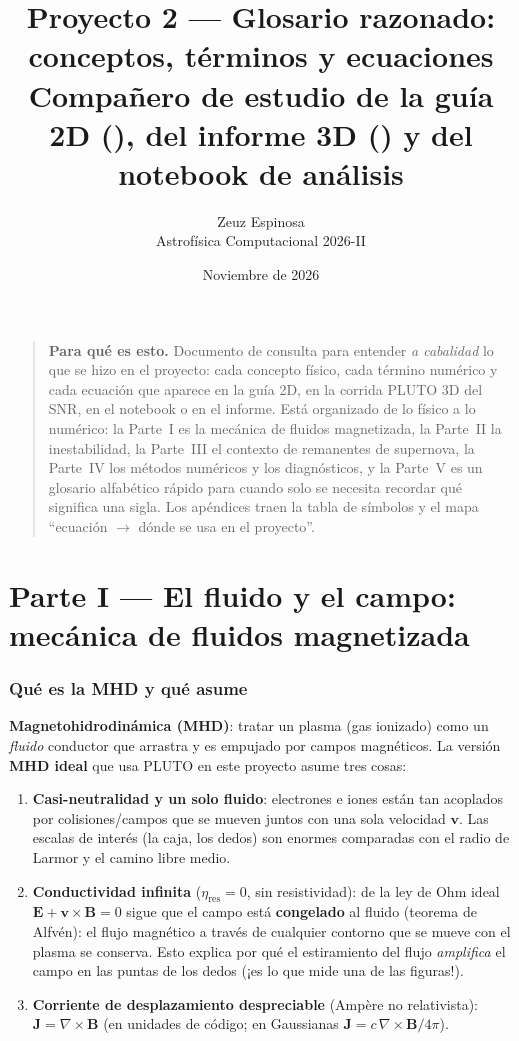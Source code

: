 \documentclass[11pt,a4paper]{article}
\title{\textbf{Proyecto 2 — Glosario razonado: conceptos, términos y ecuaciones}\\[4pt]
\large Compañero de estudio de la guía 2D (\code{Rayleigh\_Taylor\_MHD/}), del informe 3D
(\code{SNR\_3D/informe/}) y del notebook de análisis}
\author{Zeuz Espinosa\\ Astrof\'isica Computacional 2026-II}
\date{Noviembre de 2026}
\newcommand{\B}{\mathbf{B}}
\newcommand{\vct}{\mathbf{v}}
\newcommand{\term}[1]{\textbf{#1}}
\begin{document}
\maketitle

\begin{quote}\small
\textbf{Para qué es esto.} Documento de consulta para entender \emph{a cabalidad} lo que se
hizo en el proyecto: cada concepto físico, cada término numérico y cada ecuación que aparece
en la guía 2D, en la corrida PLUTO 3D del SNR, en el notebook o en el informe. Está organizado
de lo físico a lo numérico: la Parte~I es la mecánica de fluidos magnetizada, la Parte~II la
inestabilidad, la Parte~III el contexto de remanentes de supernova, la Parte~IV los métodos
numéricos y los diagnósticos, y la Parte~V es un glosario alfabético rápido para cuando solo
se necesita recordar qué significa una sigla. Los apéndices traen la tabla de símbolos y el
mapa ``ecuación $\to$ dónde se usa en el proyecto''.
\end{quote}

\tableofcontents
\clearpage

\part*{Parte I --- El fluido y el campo: mecánica de fluidos magnetizada}

\section{Qué es la MHD y qué asume}

\term{Magnetohidrodinámica (MHD)}: tratar un plasma (gas ionizado) como un \emph{fluido}
conductor que arrastra y es empujado por campos magnéticos. La versión \term{MHD ideal}
que usa PLUTO en este proyecto asume tres cosas:

\begin{enumerate}[nosep]
  \item \textbf{Casi-neutralidad y un solo fluido}: electrones e iones están tan acoplados
  por colisiones/campos que se mueven juntos con una sola velocidad $\vct$. Las escalas
  de interés (la caja, los dedos) son enormes comparadas con el radio de Larmor y el
  camino libre medio.
  \item \textbf{Conductividad infinita} ($\eta_\mathrm{res}=0$, sin resistividad): de la ley
  de Ohm ideal $\mathbf{E}+\vct\times\B=0$ sigue que el campo está \term{congelado} al
  fluido (teorema de Alfvén): el flujo magnético a través de cualquier contorno que se
  mueve con el plasma se conserva. Esto explica por qué el estiramiento del flujo
  \emph{amplifica} el campo en las puntas de los dedos (¡es lo que mide una de las figuras!).
  \item \textbf{Corriente de desplazamiento despreciable} (Ampère no relativista):
  $\mathbf{J}=\nabla\times\B$ (en unidades de código; en Gaussianas
  $\mathbf{J}=c\,\nabla\times\B/4\pi$).
\end{enumerate}
\end{document}
